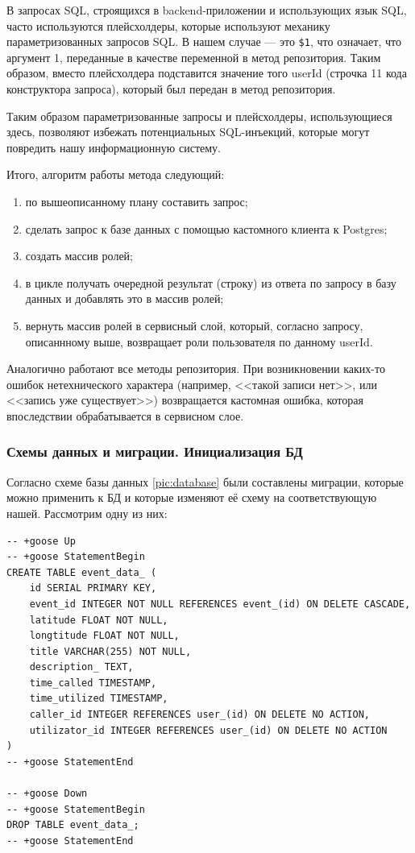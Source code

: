 \documentclass[diploma]{SCWorks}
\begin{document}
В запросах SQL, строящихся в backend-приложении и использующих язык SQL, часто
используются плейсхолдеры, которые используют механику параметризованных 
запросов SQL. В нашем случае — это \texttt{\$1}, что означает, 
что аргумент 1, переданные в качестве переменной в метод репозитория. Таким 
образом, вместо плейсхолдера подставится значение того userId (строчка 11 кода 
конструктора запроса), который был передан в метод репозитория.

Таким образом параметризованные запросы и плейсхолдеры, использующиеся здесь,
позволяют избежать потенциальных SQL-инъекций, которые могут повредить 
нашу информационную систему.

Итого, алгоритм работы метода следующий:
\begin{enumerate}
    \item по вышеописанному плану составить запрос;
    \item сделать запрос к базе данных с помощью кастомного клиента к Postgres;
    \item создать массив ролей;
    \item в цикле получать очередной результат (строку) из ответа по запросу в 
    базу данных и добавлять это в массив ролей;
    \item вернуть массив ролей в сервисный слой, который, согласно запросу, 
    описаннному выше, возвращает роли пользователя по данному userId.
\end{enumerate}

Аналогично работают все методы репозитория. При возникновении каких-то 
ошибок нетехнического характера (например, <<такой записи нет>>, или <<запись 
уже существует>>) возвращается кастомная ошибка, которая впоследствии 
обрабатывается в сервисном слое.

\subsubsection{Схемы данных и миграции. Инициализация БД}

Согласно схеме базы данных \ref{pic:database} были составлены миграции, 
которые можно применить к БД и которые изменяют её схему на соответствующую
нашей. Рассмотрим одну из них:

\begin{verbatim}
-- +goose Up
-- +goose StatementBegin
CREATE TABLE event_data_ (
    id SERIAL PRIMARY KEY,
    event_id INTEGER NOT NULL REFERENCES event_(id) ON DELETE CASCADE,
    latitude FLOAT NOT NULL,
    longtitude FLOAT NOT NULL,
    title VARCHAR(255) NOT NULL,
    description_ TEXT,
    time_called TIMESTAMP,
    time_utilized TIMESTAMP,
    caller_id INTEGER REFERENCES user_(id) ON DELETE NO ACTION,
    utilizator_id INTEGER REFERENCES user_(id) ON DELETE NO ACTION
)
-- +goose StatementEnd

-- +goose Down
-- +goose StatementBegin
DROP TABLE event_data_;
-- +goose StatementEnd
\end{verbatim}
\end{document}
